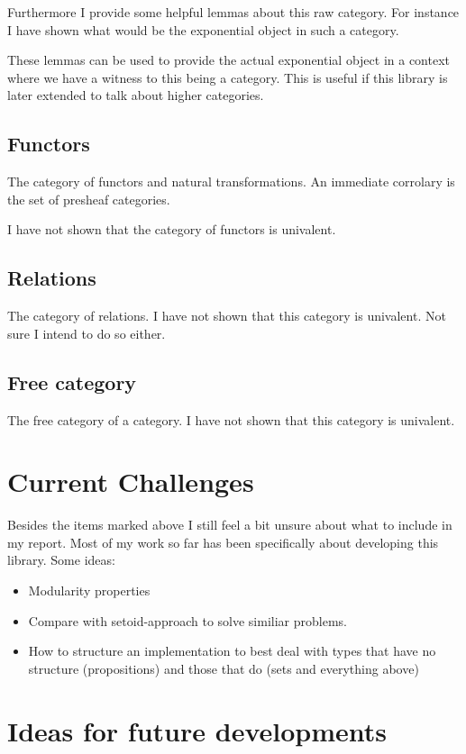 Furthermore I provide some helpful lemmas about this raw category. For instance
I have shown what would be the exponential object in such a category.

These lemmas can be used to provide the actual exponential object in a context
where we have a witness to this being a category. This is useful if this library
is later extended to talk about higher categories.

\subsection{Functors}
The category of functors and natural transformations. An immediate corrolary is
the set of presheaf categories.

\WIP{} I have not shown that the category of functors is univalent.

\subsection{Relations}
The category of relations. \WIP{} I have not shown that this category is
univalent. Not sure I intend to do so either.

\subsection{Free category}
The free category of a category. \WIP{} I have not shown that this category is
univalent.

\section{Current Challenges}
Besides the items marked \WIP{} above I still feel a bit unsure about what to
include in my report. Most of my work so far has been specifically about
developing this library. Some ideas:
%
\begin{itemize}
\item
  Modularity properties
\item
  Compare with setoid-approach to solve similiar problems.
\item
  How to structure an implementation to best deal with types that have no
  structure (propositions) and those that do (sets and everything above)
\end{itemize}
%
\section{Ideas for future developments}
